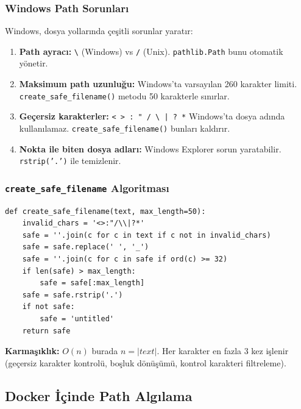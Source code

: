 \subsubsection{Windows Path Sorunlar{\i}}

Windows, dosya yollar{\i}nda \c{c}e\c{s}itli sorunlar yarat{\i}r:

\begin{enumerate}
  \item \textbf{Path ayrac{\i}:} \texttt{\textbackslash} (Windows) vs \texttt{/} (Unix). \texttt{pathlib.Path} bunu otomatik y\"{o}netir.
  \item \textbf{Maksimum path uzunlu\u{g}u:} Windows'ta varsay{\i}lan 260 karakter limiti. \texttt{create\_safe\_filename()} metodu 50 karakterle s{\i}n{\i}rlar.
  \item \textbf{Ge\c{c}ersiz karakterler:} \texttt{< > : " / \textbackslash\ | ? *} Windows'ta dosya ad{\i}nda kullan{\i}lamaz. \texttt{create\_safe\_filename()} bunlar{\i} kald{\i}r{\i}r.
  \item \textbf{Nokta ile biten dosya adlar{\i}:} Windows Explorer sorun yaratabilir. \texttt{rstrip('.')} ile temizlenir.
\end{enumerate}

\subsubsection{\texttt{create\_safe\_filename} Algoritmas{\i}}

\begin{verbatim}
def create_safe_filename(text, max_length=50):
    invalid_chars = '<>:"/\\|?*'
    safe = ''.join(c for c in text if c not in invalid_chars)
    safe = safe.replace(' ', '_')
    safe = ''.join(c for c in safe if ord(c) >= 32)
    if len(safe) > max_length:
        safe = safe[:max_length]
    safe = safe.rstrip('.')
    if not safe:
        safe = 'untitled'
    return safe
\end{verbatim}

\textbf{Karma\c{s}{\i}kl{\i}k:} $O(n)$ burada $n = |text|$. Her karakter en fazla 3 kez i\c{s}lenir (ge\c{c}ersiz karakter kontrol\"{u}, bo\c{s}luk d\"{o}n\"{u}\c{s}\"{u}m\"{u}, kontrol karakteri filtreleme).

\subsection{Docker \.{I}\c{c}inde Path Alg{\i}lama}

